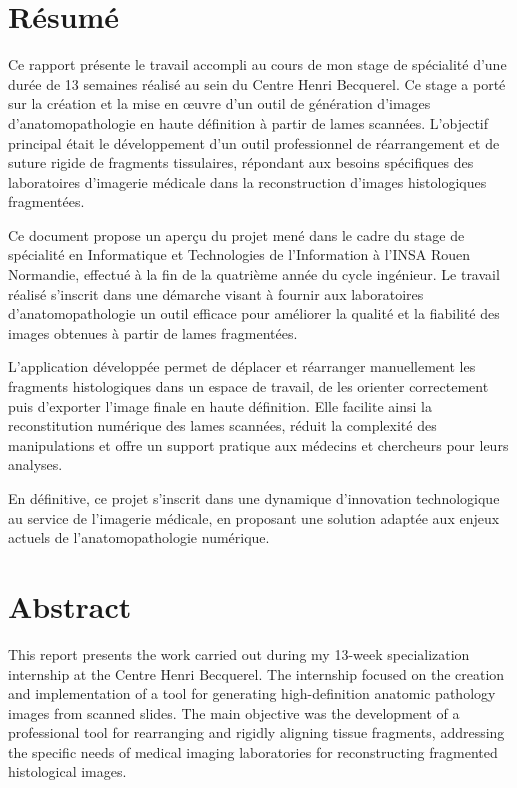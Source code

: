 \documentclass[12pt,a4paper]{report}
\begin{document}
\newpage
\thispagestyle{empty}

\vspace*{2cm}

\section*{Résumé}

Ce rapport présente le travail accompli au cours de mon stage de spécialité d'une durée de 13 semaines réalisé au sein du Centre Henri Becquerel. Ce stage a porté sur la création et la mise en œuvre d'un outil de génération d'images d'anatomopathologie en haute définition à partir de lames scannées. L'objectif principal était le développement d'un outil professionnel de réarrangement et de suture rigide de fragments tissulaires, répondant aux besoins spécifiques des laboratoires d'imagerie médicale dans la reconstruction d'images histologiques fragmentées.

Ce document propose un aperçu du projet mené dans le cadre du stage de spécialité en Informatique et Technologies de l'Information à l'INSA Rouen Normandie, effectué à la fin de la quatrième année du cycle ingénieur. Le travail réalisé s'inscrit dans une démarche visant à fournir aux laboratoires d'anatomopathologie un outil efficace pour améliorer la qualité et la fiabilité des images obtenues à partir de lames fragmentées.

L'application développée permet de déplacer et réarranger manuellement les fragments histologiques dans un espace de travail, de les orienter correctement puis d'exporter l'image finale en haute définition. Elle facilite ainsi la reconstitution numérique des lames scannées, réduit la complexité des manipulations et offre un support pratique aux médecins et chercheurs pour leurs analyses.

En définitive, ce projet s'inscrit dans une dynamique d'innovation technologique au service de l'imagerie médicale, en proposant une solution adaptée aux enjeux actuels de l'anatomopathologie numérique.

\vspace{1cm}

\section*{Abstract}

This report presents the work carried out during my 13-week specialization internship at the Centre Henri Becquerel. The internship focused on the creation and implementation of a tool for generating high-definition anatomic pathology images from scanned slides. The main objective was the development of a professional tool for rearranging and rigidly aligning tissue fragments, addressing the specific needs of medical imaging laboratories for reconstructing fragmented histological images.
\end{document}
